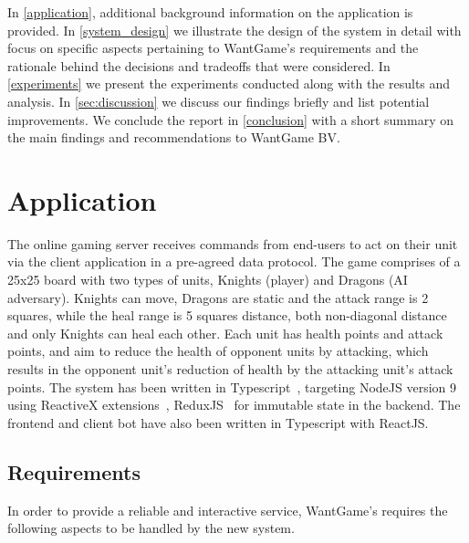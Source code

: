\documentclass[a4paper]{IEEEtran}
\begin{document}
  In \autoref{application}, additional background information on the application is provided. In \autoref{system_design} we illustrate the design of the system in detail with focus on specific aspects pertaining to WantGame's requirements and the rationale behind the decisions and tradeoffs that were considered. In \autoref{experiments} we present the experiments conducted along with the results and analysis. In \autoref{sec:discussion} we discuss our findings briefly and list potential improvements. We conclude the report in \autoref{conclusion} with a short summary on the main findings and recommendations to WantGame BV.
  
  \section{Application} \label{application}
  
  The online gaming server receives commands from end-users to act on their unit via the client application in a pre-agreed data protocol. The game comprises of a 25x25 board with two types of units, Knights (player) and Dragons (AI adversary). Knights can move, Dragons are static and the attack range is 2 squares, while the heal range is 5 squares distance, both non-diagonal distance and only Knights can heal each other. Each unit has health points and attack points, and aim to reduce the health of opponent units by attacking, which results in the opponent unit's reduction of health by the attacking unit's attack points. The system has been written in Typescript~\cite{typescript}, targeting NodeJS version 9 using ReactiveX extensions~\cite{reactivex}, ReduxJS~\cite{redux} for immutable state in the backend. The frontend and client bot have also been written in Typescript with ReactJS.
  
  \subsection{Requirements}
  
  In order to provide a reliable and interactive service, WantGame's requires the following aspects to be handled by the new system.
  
\end{document}
